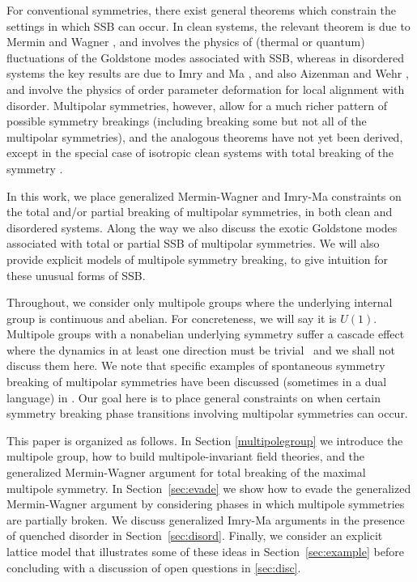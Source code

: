\documentclass[twocolumn, longbibliography]{revtex4-2}
\begin{document}
For conventional symmetries, there exist general theorems which constrain the settings in which SSB can occur. In clean systems, the relevant theorem is due to Mermin and Wagner \cite{MerminWagner}, and involves the physics of (thermal or quantum) fluctuations of the Goldstone modes associated with SSB, whereas in disordered systems the key results are due to Imry and Ma \cite{ImryMa, Vojta2013}, and also Aizenman and Wehr \cite{Aizenman}, and involve the physics of order parameter deformation for local alignment with disorder. Multipolar symmetries, however, allow for a much richer pattern of possible symmetry breakings (including breaking some but not all of the multipolar symmetries), and the analogous theorems have not yet been derived, except in the special case of isotropic clean systems with total breaking of the symmetry \cite{Griffin2013Multi}.

In this work, we place generalized Mermin-Wagner and Imry-Ma constraints on the total and/or partial breaking of multipolar symmetries, in both clean and disordered systems. Along the way we also discuss the exotic Goldstone modes associated with total or partial SSB of multipolar symmetries. We will also provide explicit models of multipole symmetry breaking, to give intuition for these unusual forms of SSB. 

Throughout, we consider only multipole groups where the underlying internal group is continuous and abelian. For concreteness, we will say it is $U(1)$. Multipole groups with a nonabelian underlying symmetry suffer a cascade effect where the dynamics in at least one direction must be trivial~\cite{nonabelian} and we shall not discuss them here. We note that specific examples of spontaneous symmetry breaking of multipolar symmetries have been discussed (sometimes in a dual language) in \cite{elastic1, elastic2, elastic3, elastic4, elastic5, FS1, FS2}. Our goal here is to place general constraints on when certain symmetry breaking phase transitions involving multipolar symmetries can occur. 

This paper is organized as follows. In Section \ref{multipolegroup} we introduce the multipole group, how to build multipole-invariant field theories, and the generalized Mermin-Wagner argument for total breaking of the maximal multipole symmetry. In Section~\ref{sec:evade} we show how to evade the generalized Mermin-Wagner argument by considering phases in which multipole symmetries are partially broken.
We discuss generalized Imry-Ma arguments in the presence of quenched disorder in Section~\ref{sec:disord}. Finally, we consider an explicit lattice model that illustrates some of these ideas in Section~\ref{sec:example} before concluding with a discussion of open questions in \ref{sec:disc}.
\end{document}
